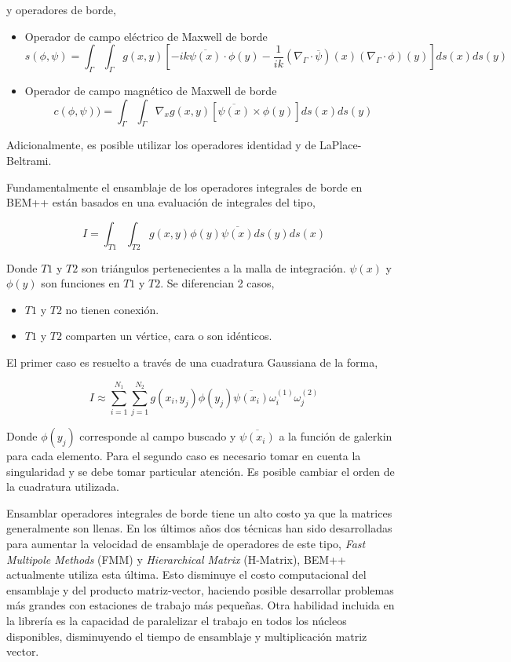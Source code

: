 \documentclass[12pt,letterpaper]{article}
\numberwithin{equation}{section}
\begin{document}
y operadores de borde,
\begin{itemize}
	\item Operador de campo eléctrico de Maxwell de borde
	$$s(\phi,\psi)=\int_{\Gamma}\int_{\Gamma}g(x,y)\left[ -ik\overline{\psi (x)}\cdotp\phi(y)-\frac{1}{ik}\left( \nabla_\Gamma\cdotp\overline{\psi}\right) (x)\left( \nabla_\Gamma\cdotp\phi\right) (y)\right] ds(x)ds(y)$$
	\item Operador de campo magnético de Maxwell de borde
	$$c(\phi,\psi))=\int_{\Gamma}\int_{\Gamma}\nabla_xg(x,y)\left[\overline{\psi (x)}\times\phi(y) \right] ds(x)ds(y)$$
\end{itemize}

Adicionalmente, es posible utilizar los operadores identidad y de LaPlace-Beltrami.

Fundamentalmente el ensamblaje de los operadores integrales de borde en BEM++ están basados en una evaluación de integrales del tipo,

$$I=\int_{T1}\int_{T2}g(x,y)\phi(y)\overline{\psi(x)}ds(y)ds(x)$$

Donde $T1$ y $T2$ son triángulos pertenecientes a la malla de integración. $\psi(x)$ y $\phi(y)$ son funciones en $T1$ y $T2$. Se diferencian 2 casos,

\begin{itemize}
	\item $T1$ y $T2$ no tienen conexión.
	\item $T1$ y $T2$ comparten un vértice, cara o son idénticos.
\end{itemize}

El primer caso es resuelto a través de una cuadratura Gaussiana de la forma,

$$I\approx\sum\limits_{i=1}^{N_1}\sum\limits_{j=1}^{N_2}g(x_i,y_j)\phi(y_j)\overline{\psi(x_i)}\omega_i^{(1)}\omega_j^{(2)}$$ 

Donde $\phi(y_j)$ corresponde al campo buscado y $\overline{\psi(x_i)}$ a la función de galerkin para cada elemento. Para el segundo caso es necesario tomar en cuenta la singularidad y se debe tomar particular atención. Es posible cambiar el orden de la cuadratura utilizada.

Ensamblar operadores integrales de borde tiene un alto costo ya que la matrices generalmente son llenas. En los últimos años dos técnicas han sido desarrolladas para aumentar la velocidad de ensamblaje de operadores de este tipo, \textit{Fast Multipole Methods} (FMM) y \textit{Hierarchical Matrix} (H-Matrix), BEM++ actualmente utiliza esta última. Esto disminuye el costo computacional del ensamblaje y del producto matriz-vector, haciendo posible desarrollar problemas más grandes con estaciones de trabajo más pequeñas. Otra habilidad incluida en la librería es la capacidad de paralelizar el trabajo en todos los núcleos disponibles, disminuyendo el tiempo de ensamblaje y multiplicación matriz vector.
\end{document}
